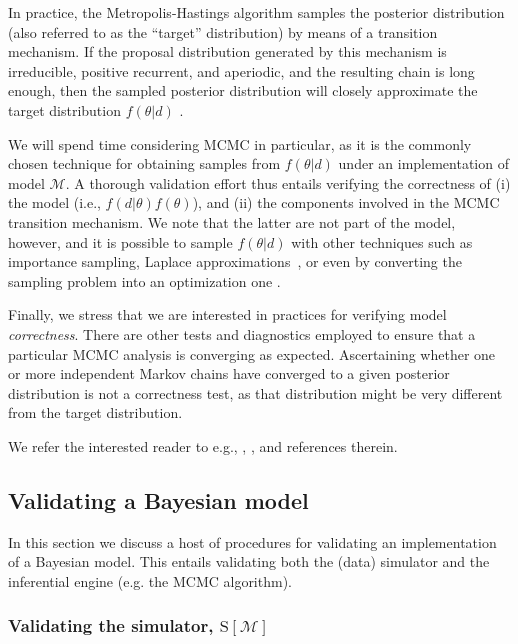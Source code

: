 \documentclass[oneside]{article}
\begin{document}
In practice, the Metropolis-Hastings algorithm samples the posterior
distribution (also referred to as the ``target'' distribution) by means of a
transition mechanism. 
If the proposal distribution generated by this mechanism is irreducible, positive recurrent, and aperiodic, and the resulting chain is long enough, then the sampled posterior distribution will closely approximate the target distribution $f(\theta|d)$ \citep{smith93,tierney94,gelman}.

We will spend time considering MCMC in particular, as it is the commonly chosen technique for obtaining samples from $f(\theta|d)$ under an implementation of model $\mathcal{M}$.
A thorough validation effort thus entails verifying the correctness of (i) the model (i.e., $f(d|\theta)f(\theta)$), and (ii) the components involved in the MCMC transition mechanism.
We note that the latter are not part of the model, however, and it is  possible to sample $f(\theta|d)$ with other techniques such as importance sampling, Laplace approximations~\citep{inla}, or even by converting the sampling problem into an optimization one \citep[e.g.,][]{zhang18}.

Finally, we stress that we are interested in practices for verifying model \emph{correctness}.
There are other tests and diagnostics employed to ensure that a particular MCMC analysis is converging as expected.
Ascertaining whether one or more independent Markov chains have converged to a given posterior distribution is not a correctness test, as that distribution might be very different from the target distribution. 

We refer the interested reader to e.g., \cite{rwty}, \cite{fabreti2022}, 
\cite{magee2023} and references therein.

\subsection*{Validating a Bayesian model}

In this section we discuss a host of procedures for validating an implementation of a Bayesian model.
This entails validating both the (data) simulator and the inferential engine (e.g. the MCMC algorithm).

\subsubsection*{Validating the simulator, $\text{S}[\mathcal{M}]$}
\label{verify-correctness-of-simulator-implementation}
\end{document}
